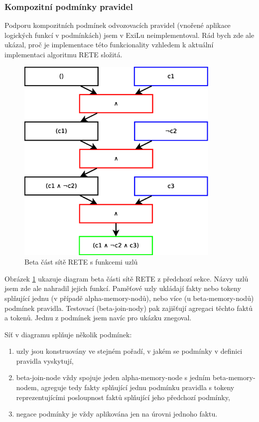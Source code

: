 \subsubsection{Kompozitní podmínky pravidel}
\label{composite conditions}

Podporu kompozitních podmínek odvozovacích pravidel (vnořené aplikace logických
funkcí v podmínkách) jsem v ExiLu neimplementoval. Rád bych zde ale ukázal, proč
je implementace této funkcionality vzhledem k aktuální implementaci algoritmu
RETE složitá.

\begin{figure}[h]
\centering
\includegraphics[height=10cm]{rete-beta-conds.eps}
\caption{Beta část sítě RETE s funkcemi uzlů}
\label{rete-beta-conds}
\end{figure}

Obrázek \ref{rete-beta-conds} ukazuje diagram beta části sítě RETE z předchozí
sekce. Názvy uzlů jsem zde ale nahradil jejich funkcí. Paměťové uzly ukládají
fakty nebo tokeny splňující jednu (v případě alpha-memory-nodů), nebo více (u
beta-memory-nodů) podmínek pravidla. Testovací (beta-join-nody) pak zajišťují
agregaci těchto faktů a tokenů. Jednu z podmínek jsem navíc pro ukázku znegoval.

Síť v diagramu splňuje několik podmínek:
\begin{enumerate}
  \item uzly jsou konstruovány ve stejném pořadí, v jakém se podmínky v definici
    pravidla vyskytují,
  \item beta-join-node vždy spojuje jeden alpha-memory-node s jedním
    beta-memory-nodem, agreguje tedy fakty splňující jednu podmínku pravidla s
    tokeny reprezentujícími posloupnost faktů splňující jeho předchozí podmínky,
  \item negace podmínky je vždy aplikována jen na úrovni jednoho faktu.
\end{enumerate}

